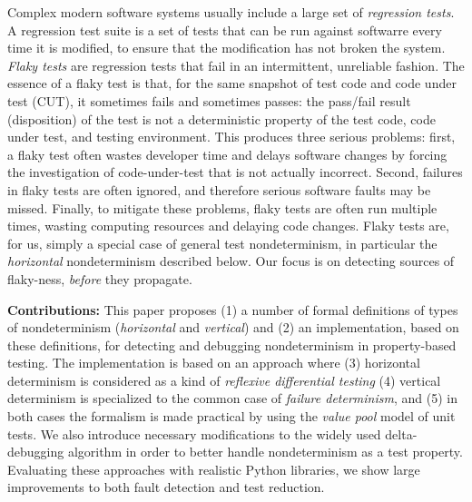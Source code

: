 Complex
modern software systems usually include a large set of
\emph{regression tests}.  A regression test suite is a
set of tests that can be run against softwarre every time it
is modified, to ensure that the modification has not broken the system.  \emph{Flaky tests} \cite{miccoflaky} are regression
tests that fail in an intermittent, unreliable fashion.  The essence of a flaky
test is that, for the same snapshot of test code and code under test
(CUT), it sometimes fails and sometimes passes: the pass/fail result (disposition) of the
test is not a deterministic property of the test code, code under
test, and testing environment.  This produces three serious
problems: first, a flaky test often wastes developer time and delays
software changes by forcing the investigation of code-under-test that
is not actually incorrect.  Second, failures in flaky tests are often ignored, and therefore serious software faults may
be missed.  Finally, to mitigate these problems, flaky tests are often
run multiple times, wasting computing resources and
delaying code changes.  Flaky tests are, for us, simply a special case of general test 
nondeterminism, in particular the 
\emph{horizontal} nondeterminism 
described below.  Our focus is on detecting sources of 
flaky-ness, \emph{before} they propagate.
\begin{comment}
  As an analogy, we note that  a canary in a coal mine is of
little use if canaries frequently become ill for reasons unrelated to
the presence of toxic gases.  Mining may stop for no good reason, or
miners may learn to ignore the canary, leading to tragedy; a third,
more ``practical'' option is that miners may carry so many redundant
canaries into the coal mine that canary-care itself becomes a serious burden.
\end{comment}





{\bf Contributions:} This paper proposes (1) a number of formal definitions of types of
nondeterminism (\emph{horizontal} and \emph{vertical}) and (2) an implementation, based on these definitions, for detecting and debugging
nondeterminism in property-based testing.  The implementation is based
on an approach where (3) horizontal determinism is considered as a
kind of \emph{reflexive differential testing} (4) vertical
determinism is specialized to the common case of \emph{failure
  determinism}, and (5)  in both cases the formalism is made practical
by using the \emph{value pool} model of unit tests.
We also introduce necessary modifications to the widely used delta-debugging algorithm in order to better handle
nondeterminism as a test property.  Evaluating these approaches with
realistic Python libraries, we show large improvements to both fault
detection and test reduction.

